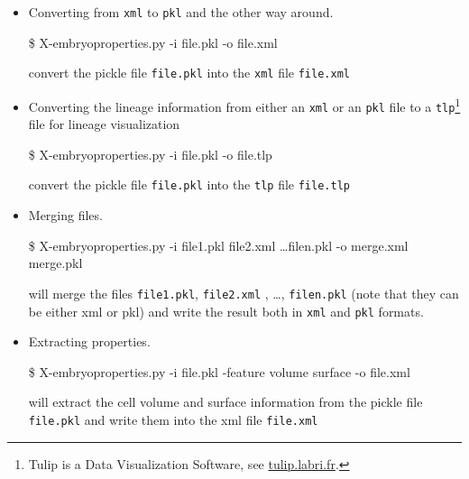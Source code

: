 \begin{itemize}
  \itemsep -1ex
\item Converting from \texttt{xml} to \texttt{pkl} and  the other way around.
  \begin{code}{0.8}
  \$ X-embryoproperties.py -i file.pkl -o file.xml
  \end{code}
  convert the pickle file \texttt{file.pkl} into the \texttt{xml} file  \texttt{file.xml}
\item Converting the lineage information from either an \texttt{xml}
  or an \texttt{pkl} file to a \texttt{tlp}\footnote{Tulip is a Data
    Visualization Software, see \url{tulip.labri.fr}.} file for lineage visualization
  \begin{code}{0.8}
  \$ X-embryoproperties.py -i file.pkl -o file.tlp
  \end{code}
  convert the pickle file \texttt{file.pkl} into the \texttt{tlp} file  \texttt{file.tlp}
\item Merging files.
  \begin{code}{0.8}
  \$ X-embryoproperties.py -i file1.pkl file2.xml \ldots filen.pkl -o merge.xml merge.pkl
  \end{code}
  will merge the files  \texttt{file1.pkl},  \texttt{file2.xml} , \ldots, \texttt{filen.pkl} (note that they can be either xml or pkl) and write the result both in \texttt{xml} and \texttt{pkl} formats.
\item Extracting properties.
  \begin{code}{0.8}
  \$ X-embryoproperties.py -i file.pkl -feature volume surface -o file.xml
  \end{code}
  will extract the cell volume and surface information from the  pickle file \texttt{file.pkl} and write them into the xml file  \texttt{file.xml}
\end{itemize}